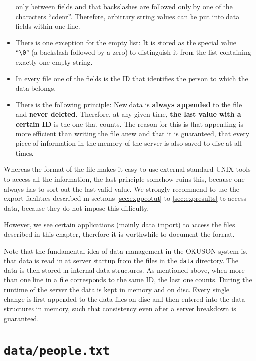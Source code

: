 \documentclass[12pt,openany,a4paper]{book}
\newcommand{\OKUSON}{\textsf{OKUSON}}
\begin{document}
\begin{itemize}
only between fields and that backslashes are followed only by one of the
characters ``cdenr''. Therefore, arbitrary string values can be put into
data fields within one line.
\item There is one exception for the empty list: It is stored as the special
value ``\verb+\0+'' (a backslash followed by a zero) to distinguish it from
the list containing exactly one empty string.
\item In every file one of the fields is the ID that identifies the person 
to which the data belongs.
\item There is the following principle: New data is \textbf{always appended}
to the file and \textbf{never deleted}. Therefore, at any given time, 
\textbf{the last value with a certain ID} is the one that counts. The
reason for this is that appending is more efficient than writing the
file anew and that it is guaranteed, that every piece of information in
the memory of the server is also saved to disc at all times.
\end{itemize}

Whereas the format of the file makes it easy to use external standard UNIX
tools to access all the information, the last principle somehow ruins this,
because one always has to sort out the last valid value. We strongly recommend
to use the export facilities described in sections \ref{sec:exppeotut}
to \ref{sec:expresults} to access data, because they do not impose this
difficulty.

However, we see certain applications (mainly data import) to access
the files described in this chapter, therefore it is worthwhile to
document the format.

Note that the fundamental idea of data management in the {\OKUSON} system
is, that data is read in at server startup from the files in the
\texttt{data} directory. The data is then stored in internal data
structures. As mentioned above, when more than one line in a file
corresponds to the same ID, the last one counts. During the runtime of the
server the data is kept in memory and on disc. Every single change is first
appended to the data files on disc and then entered into the data
structures in memory, such that consistency even after a server breakdown 
is guaranteed.

\section{\texttt{data/people.txt}}
\label{sec:people.txt}
\end{document}

